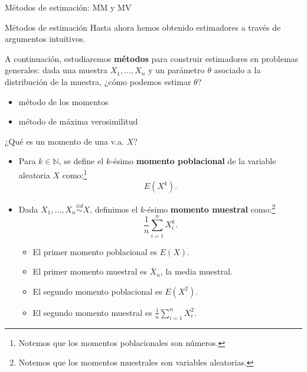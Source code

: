\documentclass{beamer}
\theoremstyle{definition}
\begin{document}
\begin{frame}{\color{rosee}M\'etodos de estimaci\'on: MM y MV}
  \begin{block}{M\'etodos de estimaci\'on}
    Hasta ahora hemos obtenido estimadores a trav\'es de argumentos
    intuitivos.  
    
    \medskip
    
    A continuaci\'on, estudiaremos \textbf{m\'etodos} para
    construir estimadores en problemas generales: dada una muestra
    $X_{1},\dots, X_{n}$ y un par\'ametro $\theta$ asociado a la
    distribuci\'on de la muestra, ¿c\'omo podemos estimar $\theta$?
    \begin{itemize}
    \item m\'etodo de los momentos
    \item m\'etodo de m\'axima verosimilitud
    \end{itemize}
  \end{block}
\end{frame}

\begin{frame}{\color{rosee}¿Qué es un momento de una v.a. $X$?} 
\begin{itemize}
    \item Para $k\in\mathbb{N}$, se define el $k$-\'esimo \textbf{momento
      poblacional} de la variable aleatoria $X$ como:\footnote{Notemos que los momentos poblacionales son números.} \[E\left(X^{k}\right).\]

  \item  Dada $X_{1},\dots, X_{n}\stackrel{iid}{\sim} X$, definimos el $k$-\'esimo \textbf{momento muestral} como:\footnote{Notemos que los momentos muestrales son variables aleatorias.} \[\frac{1}{n}\sum_{i=1}^{n}X_{i}^{k}.\]
 
 \medskip
 
     \begin{itemize}
    \item El primer momento poblacional es $E(X)$.
    \item El primer momento muestral es $\overline{X}_{n}$, la media
      muestral.
    \item El segundo momento poblacional es $E(X^2)$. 
    \item El segundo momento muestral es $\frac{1}{n}\sum_{i=1}^{n}X_{i}^{2}$.
    \end{itemize}
  \end{itemize}
\end{frame}
\end{document}
